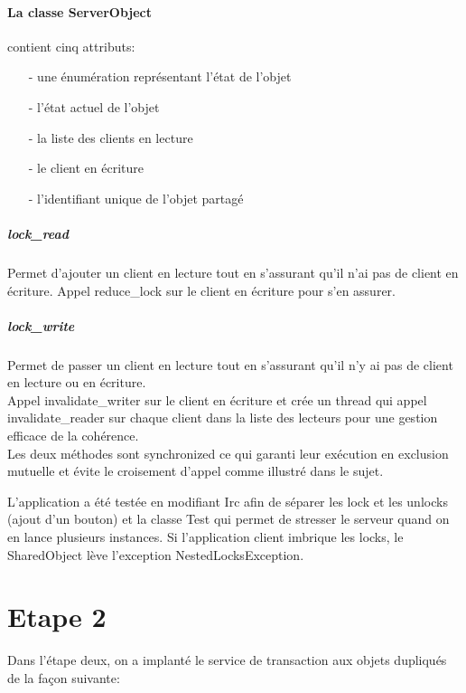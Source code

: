 \documentclass[a4paper,12pt]{article}
\begin{document}
\bigskip

\paragraph{La classe ServerObject}

 contient cinq attributs:
\begin{itemize}
\item[- une énumération représentant l'état de l'objet]
\item[- l'état actuel de l'objet]
\item[- la liste des clients en lecture]
\item[- le client en écriture]
\item[- l'identifiant unique de l'objet partagé]
\end{itemize}

\smallskip
\subparagraph{lock\_read}
Permet d'ajouter un client en lecture tout en s'assurant qu'il n'ai pas de client en écriture. Appel reduce\_lock sur le client en écriture pour s'en assurer.
\subparagraph{lock\_write}
Permet de passer un client en lecture tout en s'assurant qu'il n'y ai pas de client en lecture ou en écriture.\\
Appel invalidate\_writer sur le client en écriture et crée un thread qui appel invalidate\_reader sur chaque client dans la liste des lecteurs pour une gestion efficace de la cohérence.\\

Les deux méthodes sont synchronized ce qui garanti leur exécution en exclusion mutuelle et évite le croisement d'appel comme illustré dans le sujet.\\

\bigskip
\bigskip

L'application a été testée en modifiant Irc afin de séparer les lock et les unlocks (ajout d'un bouton) et la classe Test qui permet de stresser le serveur quand on en lance plusieurs instances. Si l'application client imbrique les locks, le SharedObject lève l'exception NestedLocksException.\\



\clearpage
\section{Etape 2}

\bigskip
\bigskip

Dans l’étape deux,  on a implanté le service de transaction aux objets dupliqués de la façon suivante:\\
\end{document}
